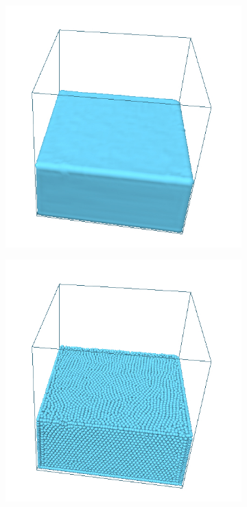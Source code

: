 \begin{figure}[h!]
    \captionsetup{justification=centering}
	\centering
	\begin{subfigure}[t]{.49\textwidth}
			\centering
        	\includegraphics[scale=1]{obrazky-figures/app/Simple04.jpg}
        	\label{fig:GaussSeidl}
	\end{subfigure}%
	\begin{subfigure}[t]{.49\textwidth}
		\centering
		\includegraphics[scale=1]{obrazky-figures/app/Simple04Part.jpg}
		\label{fig:GaussSeidlRB}
	\end{subfigure}
	\label{fig:numGauss}
\end{figure}

